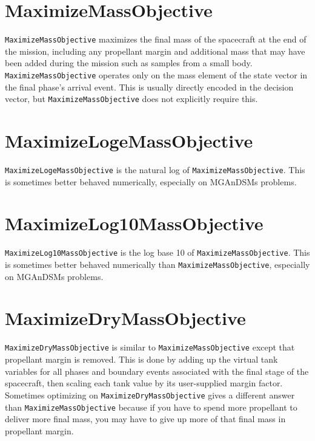 \section{MaximizeMassObjective}
\label{sec:MaximizeMassObjective}

\texttt{MaximizeMassObjective} maximizes the final mass of the spacecraft at the end of the mission, including any propellant margin and additional mass that may have been added during the mission such as samples from a small body. \texttt{MaximizeMassObjective} operates only on the mass element of the state vector in the final phase's arrival event. This is usually directly encoded in the decision vector, but \texttt{MaximizeMassObjective} does not explicitly require this.

\section{MaximizeLogeMassObjective}
\label{sec:MaximizeLogeMassObjective}

\texttt{MaximizeLogeMassObjective} is the natural log of \texttt{MaximizeMassObjective}. This is sometimes better behaved numerically, especially on \ac{MGAnDSMs} problems.

\section{MaximizeLog10MassObjective}
\label{sec:MaximizeLog10MassObjective}

\texttt{MaximizeLog10MassObjective} is the log base 10 of \texttt{MaximizeMassObjective}. This is sometimes better behaved numerically than \texttt{MaximizeMassObjective}, especially on \ac{MGAnDSMs} problems.

\section{MaximizeDryMassObjective}
\label{sec:MaximizeDryMassObjective}

\texttt{MaximizeDryMassObjective} is similar to \texttt{MaximizeMassObjective} except that propellant margin is removed. This is done by adding up the virtual tank variables for all phases and boundary events associated with the final stage of the spacecraft, then scaling each tank value by its user-supplied margin factor. Sometimes optimizing on \texttt{MaximizeDryMassObjective} gives a different answer than \texttt{MaximizeMassObjective} because if you have to spend more propellant to deliver more final mass, you may have to give up more of that final mass in propellant margin.

